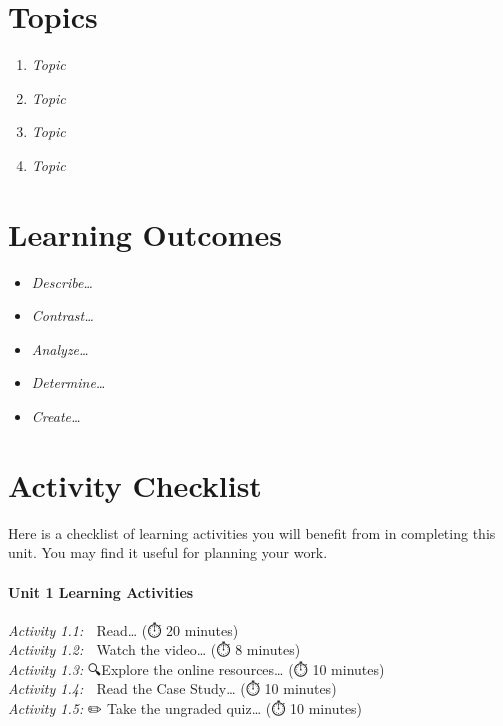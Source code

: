 \documentclass[
]{book}
\providecommand{\tightlist}{%
  \setlength{\itemsep}{0pt}\setlength{\parskip}{0pt}}
\begin{document}
\hypertarget{topics}{%
\section*{Topics}\label{topics}}

\begin{enumerate}
\def\labelenumi{\arabic{enumi}.}
\tightlist
\item
  \emph{Topic}\\
\item
  \emph{Topic}\\
\item
  \emph{Topic}\\
\item
  \emph{Topic}
\end{enumerate}

\hypertarget{learning-outcomes}{%
\section*{Learning Outcomes}\label{learning-outcomes}}

\begin{itemize}
\tightlist
\item
  \emph{Describe\ldots{}}
\item
  \emph{Contrast\ldots{}}
\item
  \emph{Analyze\ldots{}}
\item
  \emph{Determine\ldots{}}
\item
  \emph{Create\ldots{}}
\end{itemize}

\hypertarget{activity-checklist}{%
\section*{Activity Checklist}\label{activity-checklist}}

Here is a checklist of learning activities you will benefit from in completing this unit. You may find it useful for planning your work.

\begin{reflect}
\hypertarget{unit-1-learning-activities}{%
\paragraph{Unit 1 Learning
Activities}\label{unit-1-learning-activities}}

\emph{Activity 1.1:} 📗 Read\ldots{} (⏱️ 20 minutes)\\
\emph{Activity 1.2:} 🎦 Watch the video\ldots{} (⏱️ 8 minutes)\\
\emph{Activity 1.3:} 🔍Explore the online resources\ldots{} (⏱️ 10
minutes)\\
\emph{Activity 1.4:} 💼 Read the Case Study\ldots{} (⏱️ 10 minutes)\\
\emph{Activity 1.5:} ✏️ Take the ungraded quiz\ldots{} (⏱️ 10 minutes)
\end{reflect}
\end{document}

